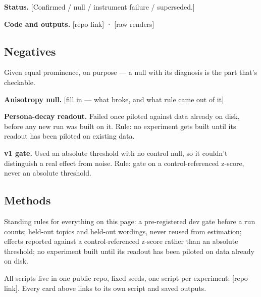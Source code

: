 \documentclass[
]{article}
\begin{document}
\textbf{Status.} {[}Confirmed / null / instrument failure /
superseded.{]}

\textbf{Code and outputs.} {[}repo link{]} · {[}raw renders{]}

\subsection{Negatives}\label{negatives}

Given equal prominence, on purpose --- a null with its diagnosis is the
part that's checkable.

\textbf{Anisotropy null.} {[}fill in --- what broke, and what rule came
out of it{]}

\textbf{Persona-decay readout.} Failed once piloted against data already
on disk, before any new run was built on it. Rule: no experiment gets
built until its readout has been piloted on existing data.

\textbf{v1 gate.} Used an absolute threshold with no control null, so it
couldn't distinguish a real effect from noise. Rule: gate on a
control-referenced z-score, never an absolute threshold.

\subsection{Methods}\label{methods}

Standing rules for everything on this page: a pre-registered dev gate
before a run counts; held-out topics and held-out wordings, never reused
from estimation; effects reported against a control-referenced z-score
rather than an absolute threshold; no experiment built until its readout
has been piloted on data already on disk.

All scripts live in one public repo, fixed seeds, one script per
experiment: {[}repo link{]}. Every card above links to its own script
and saved outputs.
\end{document}
